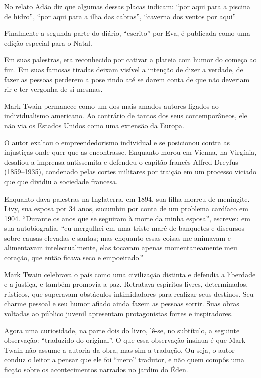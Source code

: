 \documentclass[12pt]{extarticle}
\begin{document}
No relato Adão diz que algumas dessas placas indicam: “por aqui para 
a piscina de hidro”, “por aqui para a ilha das cabras”, “caverna dos ventos por aqui”

Finalmente a segunda parte do diário, “escrito” por Eva, 
é publicada como uma edição especial para o Natal.

Em suas palestras, era reconhecido por cativar a plateia com humor do começo ao fim. 
Em suas famosas tiradas deixam visível a intenção de dizer a verdade, 
de fazer as pessoas perderem a pose rindo até se darem conta de que não
deveriam rir e ter vergonha de si mesmas.

Mark Twain permanece como um dos mais amados autores ligados ao individualismo 
americano. Ao contrário de tantos dos seus contemporâneos, ele não via os Estados Unidos 
como uma extensão da Europa. 

O autor exaltou o empreendedorismo individual e se posicionou contra as 
injustiças onde quer que as encontrasse. Enquanto morou em Vienna, na Virgínia, 
desafiou a imprensa antissemita e defendeu o capitão francês Alfred Dreyfus (1859--1935), 
condenado pelas cortes militares por traição em um processo viciado que 
que dividiu a sociedade francesa.

Enquanto dava palestras na Inglaterra, em 1894, sua filha morreu de meningite. 
Livy, sua esposa por 34 anos, sucumbiu por conta de um problema cardíaco em 1904. 
“Durante os anos que se seguiram à morte da minha esposa”, escreveu em sua autobiografia, 
“eu mergulhei em uma triste maré de banquetes e discursos sobre causas elevadas e santas; 
mas enquanto essas coisas me animavam e alimentavam intelectualmente, 
elas tocavam apenas momentaneamente meu coração, que então ficava seco e empoeirado.”

Mark Twain celebrava o país como uma civilização distinta e defendia a liberdade e a justiça, 
e também promovia a paz. 
Retratava espíritos livres, determinados, rústicos, que superavam obstáculos intimidadores para realizar seus destinos. 
Seu charme pessoal e seu humor afiado ainda fazem as pessoas sorrir. 
Suas obras voltadas ao público juvenil apresentam protagonistas fortes e inspiradores.


Agora uma curiosidade, na parte dois
do livro, lê-se, no subtítulo, a seguinte observação: “traduzido do original”.
O que essa observação insinua é que Mark Twain não assume a autoria da obra, 
mas sim a tradução.
Ou seja, o autor conduz o leitor a pensar que ele foi “mero” tradutor, 
e não quem compôs uma ficção sobre os acontecimentos narrados no jardim do Éden.
\end{document}
